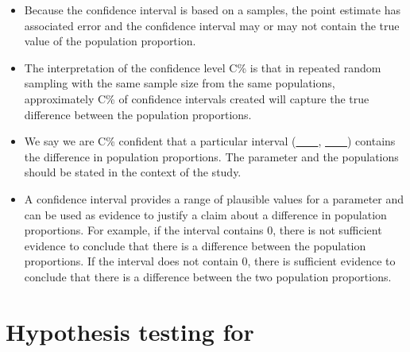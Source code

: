 \begin{itemize}
\item Because the confidence interval is based on a samples, the point estimate has associated error and the confidence interval may or may not contain the true value of the population proportion.  


\item The interpretation of the confidence level C\% is that in repeated random
sampling with the same sample size from the same populations, approximately
C\% of confidence intervals created will capture the true difference between the population proportions.

\item We say we are C\% confident that a particular interval (\underline{\ \ \ \ }, \underline{\ \ \ \ }) contains the difference in population proportions.  The parameter and the populations should be stated in the context of the study.

\item A confidence interval provides a range of plausible values for a parameter and can be used as evidence to justify a claim about a difference in population proportions.  For example, if the interval contains 0, there is not sufficient evidence to conclude that there is a difference between the population proportions. If the interval does not contain 0, there is sufficient evidence to conclude that there is a difference between the two population proportions.  


\end{itemize}

{}

\section[Hypothesis testing for a difference in population proportions]{Hypothesis testing for }
\label{pooledHTForProportionsSection}
\label{differenceOfTwoProportionsTest}

